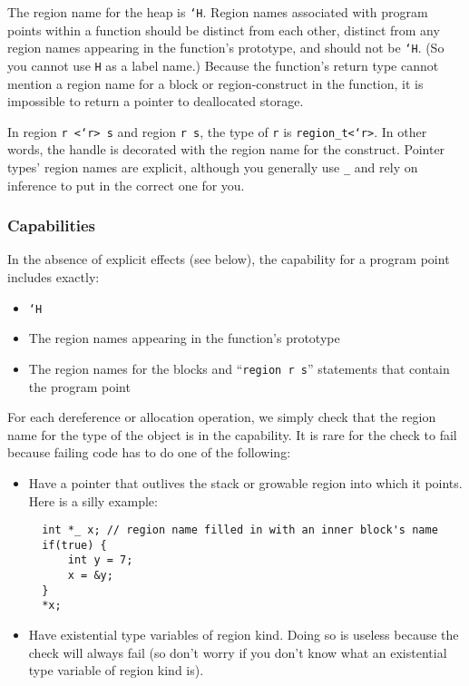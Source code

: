 The region name for the heap is \texttt{`H}.  Region names associated
with program points within a function should be distinct from each
other, distinct from any region names appearing in the function's
prototype, and should not be \texttt{`H}.  (So you cannot use
\texttt{H} as a label name.)  Because the function's return type
cannot mention a region name for a block or region-construct in the
function, it is impossible to return a pointer to deallocated storage.

In region \texttt{r <`r> s} and region \texttt{r s}, the type of \texttt{r}
is \texttt{region_t<`r>}.  In other words, the handle is decorated with
the region name for the construct.  Pointer types' region names are
explicit, although you generally use \texttt{_} and rely on inference to
put in the correct one for you.

\subsubsection{Capabilities}

In the absence of explicit effects (see below), the capability for a
program point includes exactly:
\begin{itemize}
\item \texttt{`H}
\item The region names appearing in the function's prototype 
\item The region names for the blocks and ``\texttt{region r s}''
  statements that contain the program point
\end{itemize}

For each dereference or allocation operation, we simply check that the
region name for the type of the object is in the capability.  It is
rare for the check to fail because failing code has to do one of the
following:
\begin{itemize}
\item Have a pointer that outlives the stack or growable region into
  which it points.  Here is a silly example:
\begin{verbatim}
  int *_ x; // region name filled in with an inner block's name
  if(true) {
      int y = 7;
      x = &y;
  }
  *x; 
\end{verbatim}

\item Have existential type variables of region kind.  Doing so is
  useless because the check will always fail (so don't worry if you
  don't know what an existential type variable of region kind is).
\end{itemize}

